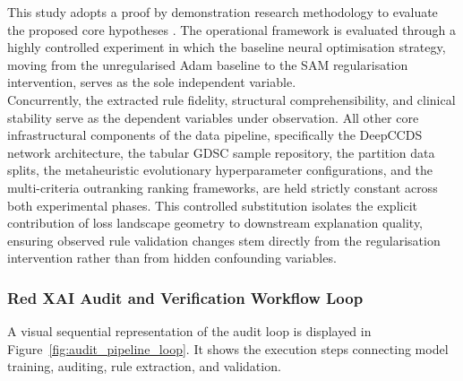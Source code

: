 \label{sub:method_overview}
This study adopts a proof by demonstration research methodology to evaluate the 
proposed core hypotheses \cite{Lachman1989}. The operational framework is evaluated 
through a highly controlled experiment in which the baseline neural optimisation strategy, 
moving from the unregularised Adam baseline to the SAM regularisation intervention, serves 
as the sole independent variable. 
\\
Concurrently, the extracted rule fidelity, structural comprehensibility, and clinical 
stability serve as the dependent variables under observation. All other core 
infrastructural components of the data pipeline, specifically the DeepCCDS network 
architecture, the tabular GDSC sample repository, the partition data splits, the 
metaheuristic evolutionary hyperparameter configurations, and the multi-criteria outranking 
ranking frameworks, are held strictly constant across both experimental phases. This 
controlled substitution isolates the explicit contribution of loss landscape geometry 
to downstream explanation quality, ensuring observed rule validation changes stem 
directly from the regularisation intervention rather than from hidden confounding variables.

\subsubsection{Red XAI Audit and Verification Workflow Loop}
\label{ssub:method_audit_workflow}
A visual sequential representation of the audit loop is displayed in
Figure~\ref{fig:audit_pipeline_loop}. It shows the execution steps connecting model training,
auditing, rule extraction, and validation.

